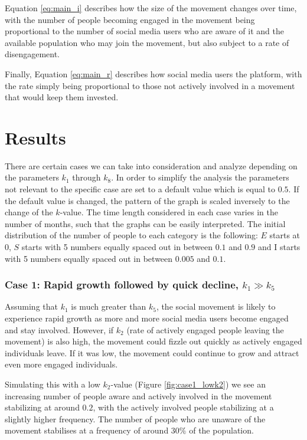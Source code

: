 \documentclass{article}
\begin{document}
    Equation \ref{eq:main_i} describes how the size of the movement changes over time, with the number of people becoming engaged in the movement being proportional to the number of social media users who are aware of it and the available population who may join the movement, but also subject to a rate of disengagement. 
    

    Finally, Equation \ref{eq:main_r} describes how social media users the platform, with the rate simply being proportional to those not actively involved in a movement that would keep them invested.
 

    \section{Results}
    
    There are certain cases we can take into consideration and analyze depending on the parameters $k_1$ through $k_8$. In order to simplify the analysis the parameters not relevant to the specific case are set to a default value which is equal to $0.5$. If the default value is changed, the pattern of the graph is scaled inversely to the change of the $k$-value.
    The time length considered in each case varies in the number of months, such that the graphs can be easily interpreted. The initial distribution of the number of people to each category is the following: $E$ starts at $0$, $S$ starts with 5 numbers equally spaced out in between $0.1$ and $0.9$ and I starts with 5 numbers equally spaced out in between $0.005$ and $0.1$.
    


    \subsubsection*{Case 1: Rapid growth followed by quick decline, $k_1 \gg k_5$} \normalfont
    Assuming that $k_1$  is much greater than $k_5$, the social movement is likely to experience rapid growth as more and more social media users become engaged and stay involved. However, if $k_2$ (rate of actively engaged people leaving the movement) is also high, the movement could fizzle out quickly as actively engaged individuals leave. If it was low, the movement could continue to grow and attract even more engaged individuals.

    Simulating this with a low $k_2$-value (Figure \ref{fig:case1_lowk2}) we see an increasing number of people aware and actively involved in the movement stabilizing at around $0.2$, with the actively involved people stabilizing at a slightly higher frequency. The number of people who are unaware of the movement stabilises at a frequency of around $30\%$ of the population.
    
\end{document}
